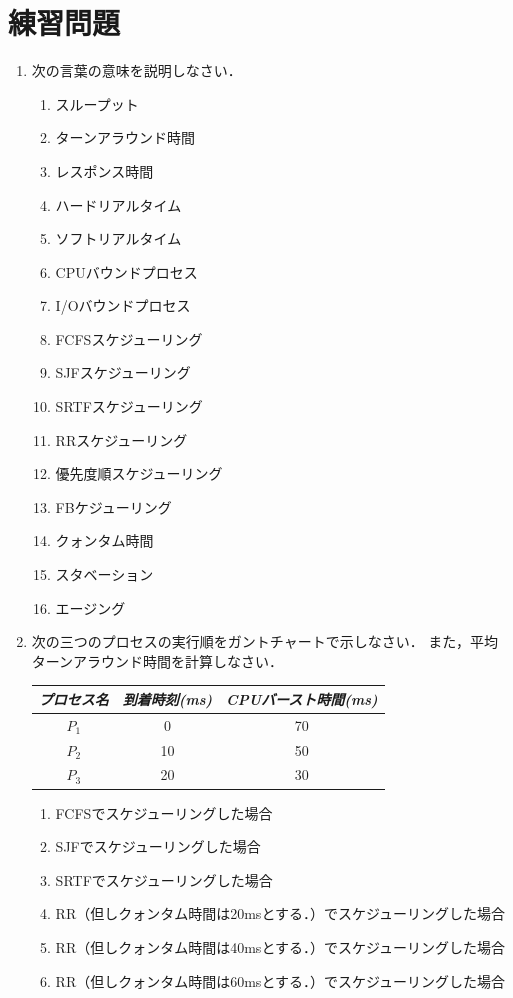 \section*{練習問題}
\begin{enumerate}
  \renewcommand{\labelenumi}{\ttfamily\arabic{chapter}.\arabic{enumi}}
  \setlength{\leftskip}{1em}
\item 次の言葉の意味を説明しなさい．
  \begin{enumerate}
    \item スループット
    \item ターンアラウンド時間
    \item レスポンス時間
    \item ハードリアルタイム
    \item ソフトリアルタイム
    \item CPUバウンドプロセス
    \item I/Oバウンドプロセス
    \item FCFSスケジューリング
    \item SJFスケジューリング
    \item SRTFスケジューリング
    \item RRスケジューリング
    \item 優先度順スケジューリング
    \item FBケジューリング
    \item クォンタム時間
    \item スタベーション
    \item エージング
  \end{enumerate}
\item 次の三つのプロセスの実行順をガントチャートで示しなさい．
  また，平均ターンアラウンド時間を計算しなさい．
  \begin{center}
    \begin{tabular}{c c c}
      \emph{プロセス名} & \emph{到着時刻(ms)} &
      \emph{CPUバースト時間(ms)} \\\hline
      $P_1$  & 0  & 70 \\
      $P_2$  & 10 & 50 \\
      $P_3$  & 20 & 30
    \end{tabular}
  \end{center}
  \begin{enumerate}
    \item FCFSでスケジューリングした場合
    \item SJFでスケジューリングした場合
    \item SRTFでスケジューリングした場合
    \item RR（但しクォンタム時間は20msとする．）でスケジューリングした場合
    \item RR（但しクォンタム時間は40msとする．）でスケジューリングした場合
    \item RR（但しクォンタム時間は60msとする．）でスケジューリングした場合
  \end{enumerate}
\end{enumerate}
